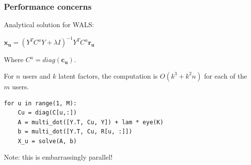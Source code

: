 \documentclass[xcolor = {table}]{beamer}
\begin{document}
  \begin{frame}[fragile]\label{math}
    \frametitle{Performance concerns}

    Analytical solution for WALS:


    \begin{center}
      $\mathbf{x_u} = (Y^TC^uY + \lambda I)^{-1}Y^TC^u\mathbf{r_u}$
      \quad
      \hyperlink{math.aux}{}
    \end{center}

    Where $C^u = diag(\mathbf{c_u})$.\\
     
    \vspace{1em}

    For $n$ users and $k$ latent factors, the computation is $O(k^3 + k^2n)$ for each of the $m$ users.

    \vspace{1em}

    \pause

    \begin{lstlisting}
for u in range(1, M):
    Cu = diag(C[u,:])
    A = multi_dot([Y.T, Cu, Y]) + lam * eye(K)
    b = multi_dot([Y.T, Cu, R[u, :]])
    X_u = solve(A, b)
    \end{lstlisting}

    Note: this is embarrassingly parallel!

  \end{frame}
\end{document}
